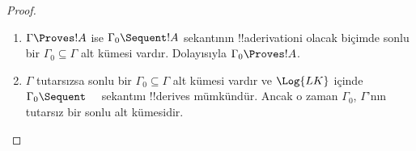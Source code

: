 \begin{proof}
  \begin{enumerate}
    \item $\Gamma \Proves !A$ ise $\Gamma_0 \Sequent !A$ sekantının
      !!a{derivation}{}i olacak biçimde sonlu bir $\Gamma_0\subseteq\Gamma$
      alt kümesi vardır. Dolayısıyla $\Gamma_0\Proves !A$.
    \item $\Gamma$ tutarsızsa sonlu bir $\Gamma_0\subseteq\Gamma$ alt
      kümesi vardır ve $\Log{LK}$ içinde $\Gamma_0\Sequent\quad$ sekantını
      !!{derive}s mümkündür. Ancak o zaman $\Gamma_0$, $\Gamma$'nın tutarsız bir
      sonlu alt kümesidir.
  \end{enumerate}
\end{proof}

